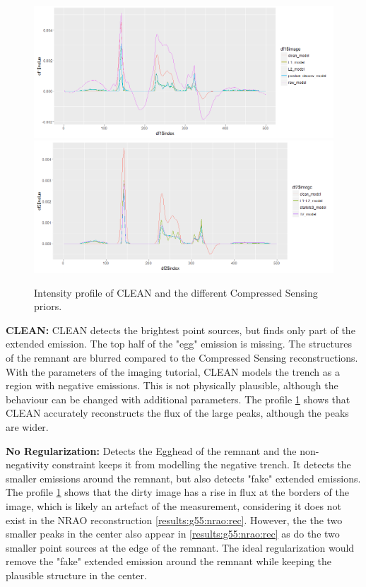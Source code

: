 \begin{figure}
	\includegraphics[width=\linewidth, clip]{./chapters/05.results/tmp0.png}
	\includegraphics[width=\linewidth, clip]{./chapters/05.results/tmp1.png}
	\caption{Intensity profile of CLEAN and the different Compressed Sensing priors.}
	\label{res:g55:profile}
\end{figure}

\textbf{CLEAN:} CLEAN detects the brightest point sources, but finds only part of the extended emission. The top half of the "egg" emission is missing. The structures of the remnant are blurred compared to the Compressed Sensing reconstructions. With the parameters of the imaging tutorial, CLEAN models the trench as a region with negative emissions. This is not physically plausible, although the behaviour can be changed with additional parameters. The profile \ref{res:g55:profile} shows that CLEAN accurately reconstructs the flux of the large peaks, although the peaks are wider.

\textbf{No Regularization:} Detects the Egghead of the remnant and the non-negativity constraint keeps it from modelling the negative trench. It detects the smaller emissions around the remnant, but also detects "fake" extended emissions. The profile \ref{res:g55:profile} shows that the dirty image has a rise in flux at the borders of the image, which is likely an artefact of the measurement, considering it does not exist in the NRAO reconstruction \ref{results:g55:nrao:rec}. However, the the two smaller peaks in the center also appear in \ref{results:g55:nrao:rec} as do the two smaller point sources at the edge of the remnant. The ideal regularization would remove the "fake" extended emission around the remnant while keeping the plausible structure in the center.

